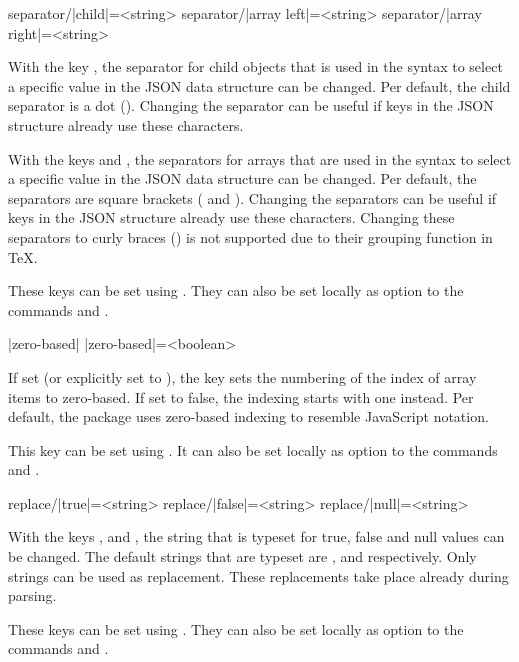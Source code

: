\documentclass[a4paper]{article}
\begin{document}
{{\begin{macrodef}
separator/|child|={<string>}
separator/|array left|={<string>}
separator/|array right|={<string>}
\end{macrodef}
With the key , the separator for child objects that is used in the syntax to select a specific value in the JSON data structure can be changed. Per default, the child separator is a dot (). Changing the separator can be useful if keys in the JSON structure already use these characters. 

With the keys  and , the separators for arrays that are used in the syntax to select a specific value in the JSON data structure can be changed. Per default, the separators are square brackets (\macro{[} and \macro{]}). Changing the separators can be useful if keys in the JSON structure already use these characters. Changing these separators to curly braces (\macro{{}}) is not supported due to their grouping function in TeX. 

These keys can be set using \macro{\JSONParseSet}. They can also be set locally as option to the commands \macro{\JSONParse} and \macro{\JSONParseFromFile}.

\begin{macrodef}
|zero-based|
|zero-based|={<boolean>}
\end{macrodef}
If set (or explicitly set to ), the key  sets the numbering of the index of array items to zero-based. If set to false, the indexing starts with one instead. Per default, the package uses zero-based indexing to resemble JavaScript notation.

This key can be set using \macro{\JSONParseSet}. It can also be set locally as option to the commands \macro{\JSONParse} and \macro{\JSONParseFromFile}.

\begin{macrodef}
replace/|true|={<string>}
replace/|false|={<string>}
replace/|null|={<string>}
\end{macrodef}
With the keys ,  and , the string that is typeset for true, false and null values can be changed. The default strings that are typeset are ,  and  respectively. Only strings can be used as replacement. These replacements take place already during parsing.

These keys can be set using \macro{\JSONParseSet}. They can also be set locally as option to the commands \macro{\JSONParse} and \macro{\JSONParseFromFile}.

}}
\end{document}
